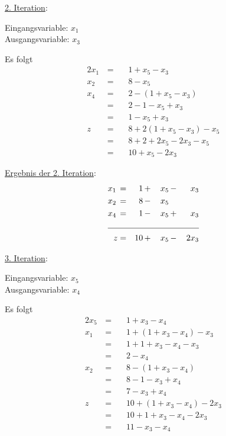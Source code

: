 \documentclass[10pt,a4paper,oneside,ngerman,numbers=noenddot]{scrartcl}
\begin{document}
		\underline{2. Iteration}:
		
		Eingangsvariable: $x_{1}$ \\
		Ausgangsvariable: $x_{3}$
		
		Es folgt
		\begin{alignat*}{2}
			x_{1} \,&=&&\, 1 + x_{5} - x_{3} \\
			x_{2} \,&=&&\, 8 - x_{5}\\
			x_{4} \,&=&&\, 2 - \left(1 + x_{5} - x_{3}\right) \\
			&=&&\, 2 - 1 - x_{5} + x_{3} \\
			&=&&\, 1 - x_{5} + x_{3} \\
			z \,&=&&\, 8 + 2\left(1 + x_{5} - x_{3}\right) - x_{5} \\
			&=&&\, 8 + 2 + 2x_{5} - 2x_{3} - x_{5} \\
			&=&&\, 10 + x_{5} - 2x_{3} 
		\end{alignat*}
		
		\underline{Ergebnis der 2. Iteration}:
		\begin{alignat*}{4}
			x_{1} \,&=&\, 1 \,&+&\, x_{5} \,&-&\, x_{3} \\
			x_{2} \,&=&\, 8 \,&-&\, x_{5} \,&& \\
			x_{4} \,&=&\, 1 \,&-&\, x_{5} \,&+&\, x_{3} \\ \cline{1 - 7}
			z &=& 10 \,&+&\, x_{5} \,&-&\, 2x_{3}
		\end{alignat*}
		
		\underline{3. Iteration}:
		
		Eingangsvariable: $x_{5}$ \\
		Ausgangsvariable: $x_{4}$
		
		Es folgt
		\begin{alignat*}{2}
			x_{5} \,&=&&\, 1 + x_{3} - x_{4} \\
			x_{1} \,&=&&\, 1 + \left(1 + x_{3} - x_{4}\right) - x_{3} \\
			&=&&\, 1 + 1 + x_{3} - x_{4} - x_{3} \\
			&=&&\, 2 - x_{4} \\
			x_{2} \,&=&&\, 8 - \left(1 + x_{3} - x_{4}\right) \\
			&=&&\, 8 - 1 - x_{3} + x_{4} \\
			&=&&\, 7 - x_{3} + x_{4} \\
			z \,&=&&\, 10 + \left(1 + x_{3} - x_{4}\right) - 2x_{3} \\
			&=&&\, 10 + 1 + x_{3} - x_{4} - 2x_{3} \\
			&=&&\, 11 - x_{3} - x_{4} 
		\end{alignat*}
		
\end{document}
